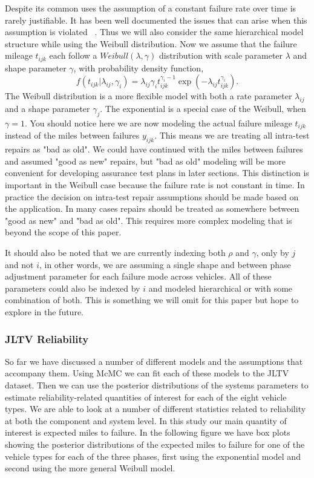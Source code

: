 \documentclass[12pt]{article}
\begin{document}
Despite its common uses the assumption of a constant failure rate over time is
rarely justifiable.  It has been well documented the issues that can arise when
this assumption is violated ~\cite{ref2}.  Thus we will also consider the same
hierarchical model structure while using the Weibull distribution.  Now we
assume that the failure mileage $t_{ijk}$ each follow a $Weibull(\lambda, \gamma)$
distribution with scale parameter $\lambda$ and shape parameter $\gamma$, with
probability density function,
\begin{equation*}
    f(t_{ijk}|\lambda_{ij},\gamma_{i})=\lambda_{ij}\gamma_{i}
    t_{ijk}^{\gamma_{i}-1}\exp(-\lambda_{ij} t_{ijk}^{\gamma_{i}}).
\end{equation*}
The Weibull distribution is a more flexible model with both a rate parameter
$\lambda_{ij}$ and a shape parameter $\gamma_{j}$.  The exponential is a special
case of the Weibull, when $\gamma = 1$.  You should notice here we are now
modeling the actual failure mileage $t_{ijk}$ instead of the miles between
failures $y_{ijk}$.  This means we are treating all intra-test repairs as "bad
as old".  We could have continued with the miles between failures and assumed
"good as new" repairs, but "bad as old" modeling will be more convenient for
developing assurance test plans in later sections.  This distinction is
important in the Weibull case because the failure rate is not constant in time.
In practice the decision on intra-test repair assumptions should be made based
on the application.  In many cases repairs should be treated as somewhere
between "good as new" and "bad as old".  This requires more complex modeling
that is beyond the scope of this paper.

It should  also be noted that we are currently indexing both $\rho$ and
$\gamma$, only by $j$ and not $i$, in other words, we are assuming a single
shape and between phase adjustment parameter for each failure mode across
vehicles.  All of these parameters could also be indexed by $i$ and modeled
hierarchical or with some combination of both.  This is something we will omit
for this paper but hope to explore in the future.

\subsubsection{JLTV Reliability}
So far we have discussed a number of different models and the assumptions that
accompany them.  Using McMC we can fit each of these models to the JLTV dataset.
Then we can use the posterior distributions of the systems parameters to
estimate reliability-related quantities of interest for each of the eight
vehicle types.  We are able to look at a number of different statistics related
to reliability at both  the component and system level.  In this study our main
quantity of interest is expected miles to  failure.  In the following figure we
have box plots showing the posterior distributions of  the expected miles to
failure for one of the vehicle types for each of the three phases, first using
the exponential model and second using the more general Weibull model.
\end{document}
